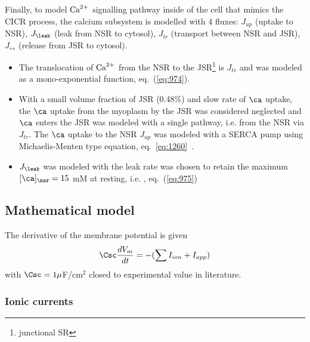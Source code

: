 Finally, to model ${\text{Ca}^{2+}}$ signalling pathway inside of the cell
that mimics the CICR process, the calcium subsystem is modelled with 4
fluxes: $J_{up}$ (uptake to NSR), $J_\leak$ (leak from NSR to
cytosol), $J_{tr}$ (transport between NSR and JSR), $J_\rel$ (release
from JSR to cytosol).
\begin{itemize}
\item The translocation of ${\text{Ca}^{2+}}$ from the NSR to the
  JSR\footnote{junctional SR} is $J_{tr}$ and was modeled as a
  mono-exponential function, eq.~(\ref{eq:974}).

\item With a small volume fraction of JSR (0.48\%) and slow rate of
  $\ca$ uptake, the $\ca$ uptake from the myoplasm by the JSR was
  considered neglected and $\ca$ enters the JSR was modeled with a
  single pathway, i.e. from the NSR via $J_{tr}$. The $\ca$ uptake to
  the NSR $J_{up}$ was modeled with a SERCA pump using
  Michaelis-Menten type equation,
  eq.~\eqref{eq:1260}~\citep{haynes1987}.

\item $J_\leak$ was modeled with the leak rate was chosen to retain
  the maximum $[\ca]_\nsr=15$ mM at resting, i.e. , eq.~(\ref{eq:975})
\end{itemize}


\subsection{Mathematical model}
\label{sec:mathematical-model-11}

The derivative of the membrane potential is given
\begin{equation}
  \label{eq:1263}
  \Csc\frac{dV_m}{dt} = -(\sum I_{ion} + I_{app})
\end{equation}
with $\Csc=1\mu$F/cm$^2$ closed to experimental value in literature.

\subsubsection{Ionic currents}
\label{sec:ionic-currents-6}

